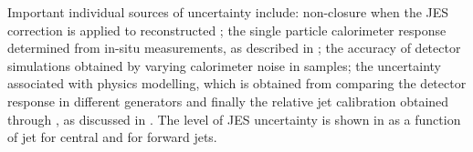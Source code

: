 Important individual sources of uncertainty include: non-closure when the JES
correction is applied to reconstructed \MC; the single particle calorimeter response determined
from in-situ measurements, as described in ;
the accuracy of detector simulations obtained by varying calorimeter noise in \MC samples; the
uncertainty associated with physics modelling, which is obtained from comparing
the detector response in different \MC generators and finally the  relative
jet calibration obtained through \etaint, as discussed in
. The level of JES uncertainty is shown in
 as a function of jet \pT for
central and for forward jets.

\begin{figure}[htpb]
  \quad
\end{figure}
